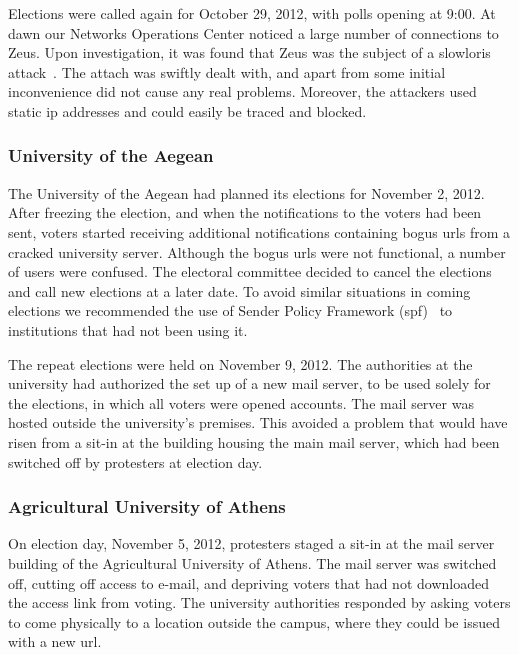 \documentclass[letterpaper,10pt]{article}
\begin{document}
Elections were called again for October 29, 2012, with polls opening
at 9:00. At dawn our Networks Operations Center noticed a large number
of connections to Zeus. Upon investigation, it was found that Zeus was
the subject of a slowloris attack~\cite{slowloris}. The attach was
swiftly dealt with, and apart from some initial inconvenience did not
cause any real problems. Moreover, the attackers used static {\sc ip}
addresses and could easily be traced and blocked.

\subsubsection{University of the Aegean}

The University of the Aegean had planned its elections for November 2,
2012. After freezing the election, and when the notifications to the
voters had been sent, voters started receiving additional
notifications containing bogus {\sc url}s from a cracked university server.
Although the bogus {\sc url}s were not functional, a number of users were
confused. The electoral committee decided to cancel the elections and
call new elections at a later date. To avoid similar situations in
coming elections we recommended the use of Sender Policy Framework
({\sc spf})~\cite{rfc4408} to institutions that had not been using it.

The repeat elections were held on November 9, 2012. The authorities at
the university had authorized the set up of a new mail server, to be
used solely for the elections, in which all voters were opened
accounts. The mail server was hosted outside the university's
premises. This avoided a problem that would have risen from a sit-in
at the building housing the main mail server, which had been switched
off by protesters at election day.

\subsubsection{Agricultural University of Athens}

On election day, November 5, 2012, protesters staged a sit-in at the
mail server building of the Agricultural University of Athens. The
mail server was switched off, cutting off access to e-mail, and
depriving voters that had not downloaded the access link from voting.
The university authorities responded by asking voters to come
physically to a location outside the campus, where they could be
issued with a new {\sc url}.
\end{document}
